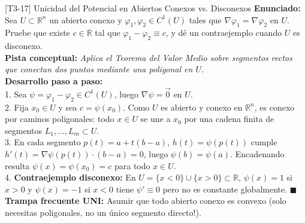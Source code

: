 \documentclass[11pt,a4paper]{article}
\begin{document}
\begin{ejerciciobox}{[T3-17] Unicidad del Potencial en Abiertos Conexos vs. Disconexos}
\textbf{Enunciado:} Sea $U \subset \mathbb{R}^n$ un abierto conexo y $\varphi_1, \varphi_2 \in C^1(U)$ tales que $\nabla\varphi_1 = \nabla\varphi_2$ en $U$. Pruebe que existe $c \in \mathbb{R}$ tal que $\varphi_1 - \varphi_2 \equiv c$, y dé un contraejemplo cuando $U$ es disconexo.\\[0.2cm]
\textbf{Pista conceptual:} \emph{Aplica el Teorema del Valor Medio sobre segmentos rectos que conectan dos puntos mediante una poligonal en $U$.}\\[0.2cm]
\textbf{Desarrollo paso a paso:}\\
1. Sea $\psi = \varphi_1 - \varphi_2 \in C^1(U)$, luego $\nabla\psi = \vec{0}$ en $U$.\\
2. Fija $x_0 \in U$ y sea $c = \psi(x_0)$. Como $U$ es abierto y conexo en $\mathbb{R}^n$, es conexo por caminos poligonales: todo $x \in U$ se une a $x_0$ por una cadena finita de segmentos $L_1, \dots, L_m \subset U$.\\
3. En cada segmento $p(t) = a + t(b-a)$, $h(t) = \psi(p(t))$ cumple $h'(t) = \nabla\psi(p(t))\cdot(b-a) = 0$, luego $\psi(b) = \psi(a)$. Encadenando resulta $\psi(x) = \psi(x_0) = c$ para todo $x \in U$.\\
4. \textbf{Contraejemplo disconexo:} En $U = \{x < 0\} \cup \{x > 0\} \subset \mathbb{R}$, $\psi(x) = 1$ si $x > 0$ y $\psi(x) = -1$ si $x < 0$ tiene $\psi' \equiv 0$ pero no es constante globalmente. $\blacksquare$\\[0.2cm]
\textbf{Trampa frecuente UNI:} Asumir que todo abierto conexo es convexo (solo necesitas poligonales, no un único segmento directo!).
\end{ejerciciobox}
\end{document}
